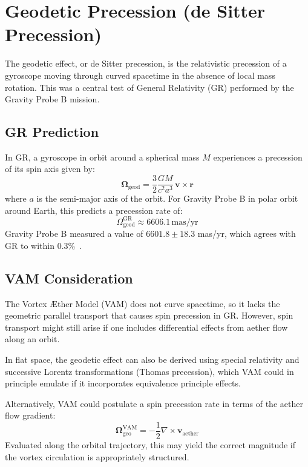 \section{Geodetic Precession (de Sitter Precession)}

The geodetic effect, or de Sitter precession, is the relativistic precession of a gyroscope moving through curved spacetime in the absence of local mass rotation. This was a central test of General Relativity (GR) performed by the Gravity Probe B mission.

\subsection*{GR Prediction}

In GR, a gyroscope in orbit around a spherical mass $M$ experiences a precession of its spin axis given by:
\begin{equation}
    \boldsymbol{\Omega}_{\text{geod}} = \frac{3}{2} \frac{GM}{c^2 a^3} \, \mathbf{v} \times \mathbf{r}
\end{equation}
where $a$ is the semi-major axis of the orbit. For Gravity Probe B in polar orbit around Earth, this predicts a precession rate of:
\begin{equation}
    \Omega_{\text{geod}}^{\text{GR}} \approx 6606.1 \, \text{mas/yr}
\end{equation}
Gravity Probe B measured a value of $6601.8 \pm 18.3$ mas/yr, which agrees with GR to within $0.3\%$~\cite{everitt2011}.

\subsection*{VAM Consideration}

The Vortex \AE ther Model (VAM) does not curve spacetime, so it lacks the geometric parallel transport that causes spin precession in GR. However, spin transport might still arise if one includes differential effects from aether flow along an orbit.

In flat space, the geodetic effect can also be derived using special relativity and successive Lorentz transformations (Thomas precession), which VAM could in principle emulate if it incorporates equivalence principle effects.

Alternatively, VAM could postulate a spin precession rate in terms of the aether flow gradient:
\begin{equation}
    \boldsymbol{\Omega}_{\text{geo}}^{\text{VAM}} = -\frac{1}{2} \nabla \times \mathbf{v}_{\text{aether}}
\end{equation}
Evaluated along the orbital trajectory, this may yield the correct magnitude if the vortex circulation is appropriately structured.

